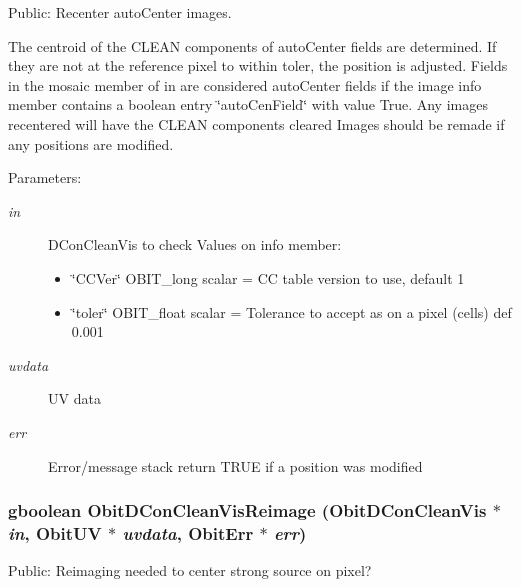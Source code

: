 Public: Recenter auto\-Center images. 

The centroid of the CLEAN components of auto\-Center fields are determined. If they are not at the reference pixel to within toler, the position is adjusted. Fields in the mosaic member of in are considered auto\-Center fields if the image info member contains a boolean entry \char`\"{}auto\-Cen\-Field\char`\"{} with value True. Any images recentered will have the CLEAN components cleared Images should be remade if any positions are modified. \begin{Desc}
\item[Parameters:]
\begin{description}
\item[{\em in}]DCon\-Clean\-Vis to check Values on info member: \begin{itemize}
\item \char`\"{}CCVer\char`\"{} OBIT\_\-long scalar = CC table version to use, default 1 \item \char`\"{}toler\char`\"{} OBIT\_\-float scalar = Tolerance to accept as on a pixel (cells) def 0.001 \end{itemize}
\item[{\em uvdata}]UV data \item[{\em err}]Error/message stack return TRUE if a position was modified \end{description}
\end{Desc}
\subsubsection{\setlength{\rightskip}{0pt plus 5cm}gboolean Obit\-DCon\-Clean\-Vis\-Reimage ({\bf Obit\-DCon\-Clean\-Vis} $\ast$ {\em in}, {\bf Obit\-UV} $\ast$ {\em uvdata}, {\bf Obit\-Err} $\ast$ {\em err})}\label{ObitDConCleanVis_8h_a22}


Public: Reimaging needed to center strong source on pixel? 


